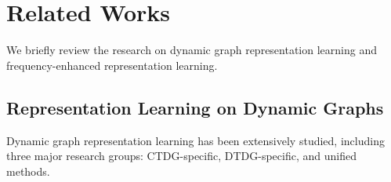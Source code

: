 \section{Related Works}
We briefly review the research on dynamic graph representation learning and frequency-enhanced representation learning.


\subsection{Representation Learning on Dynamic Graphs}  
Dynamic graph representation learning has been extensively studied, including three major research groups: CTDG-specific, DTDG-specific, and unified methods.



